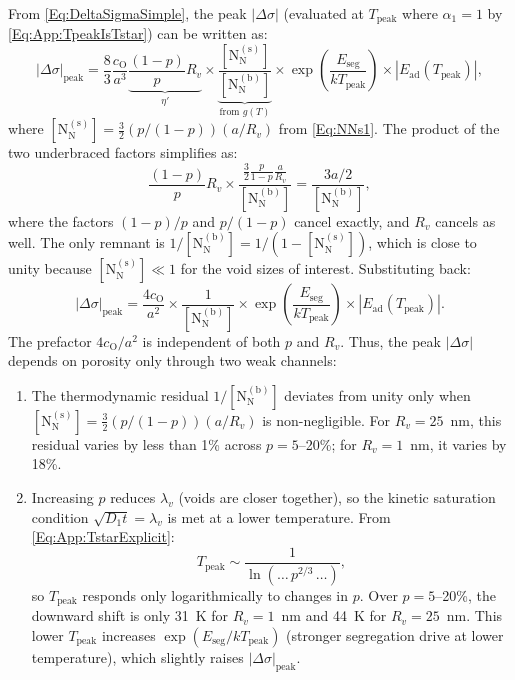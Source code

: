 \documentclass[preprint,12pt,sort&compress]{elsarticle}
\newcommand{\?}{\stackrel{?}{=}}
\begin{document}
From \cref{Eq:DeltaSigmaSimple}, the peak $|\Delta\sigma|$ (evaluated at $T_\text{peak}$ where $\alpha_1 = 1$ by \cref{Eq:App:TpeakIsTstar}) can be written as:
\begin{equation}
|\Delta\sigma|_\text{peak} = \frac{8}{3} \frac{c_\text{O}}{a^3} \underbrace{\frac{(1-p)}{p} R_v}_{\eta'} \times \underbrace{\frac{[\text{N}_\text{N}^{(\text{s})}]}{[\text{N}_\text{N}^{(\text{b})}]}}_{\text{from } g(T)} \times \exp\!\left(\frac{E_\text{seg}}{kT_\text{peak}}\right) \times |E_\text{ad}(T_\text{peak})|,
\label{Eq:App:DsigPeak}
\end{equation}
where $[\text{N}_\text{N}^{(\text{s})}] = \frac{3}{2}(p/(1-p))(a/R_v)$ from \cref{Eq:NNs1}. The product of the two underbraced factors simplifies as:
\begin{equation}
\frac{(1-p)}{p} R_v \times \frac{\frac{3}{2}\frac{p}{1-p}\frac{a}{R_v}}{[\text{N}_\text{N}^{(\text{b})}]} = \frac{3a/2}{[\text{N}_\text{N}^{(\text{b})}]},
\label{Eq:App:cancel}
\end{equation}
where the factors $(1-p)/p$ and $p/(1-p)$ cancel exactly, and $R_v$ cancels as well. The only remnant is $1/[\text{N}_\text{N}^{(\text{b})}] = 1/(1 - [\text{N}_\text{N}^{(\text{s})}])$, which is close to unity because $[\text{N}_\text{N}^{(\text{s})}] \ll 1$ for the void sizes of interest. Substituting back:
\begin{equation}
|\Delta\sigma|_\text{peak} = \frac{4 c_\text{O}}{a^2} \times \frac{1}{[\text{N}_\text{N}^{(\text{b})}]} \times \exp\!\left(\frac{E_\text{seg}}{kT_\text{peak}}\right) \times |E_\text{ad}(T_\text{peak})|.
\label{Eq:App:DsigPeakReduced}
\end{equation}
The prefactor $4c_\text{O}/a^2$ is independent of both $p$ and $R_v$. Thus, the peak $|\Delta\sigma|$ depends on porosity only through two weak channels:
\begin{enumerate}[label=(\alph*)]
\item The thermodynamic residual $1/[\text{N}_\text{N}^{(\text{b})}]$ deviates from unity only when $[\text{N}_\text{N}^{(\text{s})}] = \frac{3}{2}(p/(1-p))(a/R_v)$ is non-negligible. For $R_v = 25$~nm, this residual varies by less than 1\% across $p = 5$--20\%; for $R_v = 1$~nm, it varies by 18\%.
\item Increasing $p$ reduces $\lambda_v$ (voids are closer together), so the kinetic saturation condition $\sqrt{D_1 t} = \lambda_v$ is met at a lower temperature. From \cref{Eq:App:TstarExplicit}:
\begin{equation}
T_\text{peak} \sim \frac{1}{\ln\!\left(\ldots\, p^{2/3} \,\ldots\right)},
\end{equation}
so $T_\text{peak}$ responds only logarithmically to changes in $p$. Over $p = 5$--20\%, the downward shift is only 31~K for $R_v = 1$~nm and 44~K for $R_v = 25$~nm. This lower $T_\text{peak}$ increases $\exp(E_\text{seg}/kT_\text{peak})$ (stronger segregation drive at lower temperature), which slightly raises $|\Delta\sigma|_\text{peak}$.
\end{enumerate}
\end{document}
